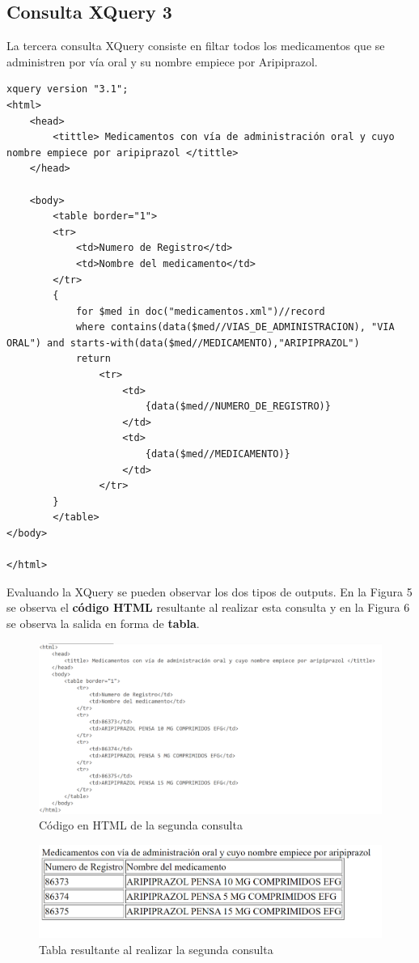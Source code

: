 \documentclass[../main.tex]{subfiles}
\begin{document}
\subsection{Consulta XQuery 3}
La tercera consulta XQuery consiste en filtar todos los medicamentos que se administren por vía oral y su nombre empiece por Aripiprazol.

\begin{lstlisting}
xquery version "3.1";
<html>
    <head>
        <tittle> Medicamentos con vía de administración oral y cuyo nombre empiece por aripiprazol </tittle>
    </head>
    
    <body>
        <table border="1">
        <tr>
            <td>Numero de Registro</td>
            <td>Nombre del medicamento</td>
        </tr>
        {
            for $med in doc("medicamentos.xml")//record
            where contains(data($med//VIAS_DE_ADMINISTRACION), "VIA ORAL") and starts-with(data($med//MEDICAMENTO),"ARIPIPRAZOL")
            return 
                <tr> 
                    <td> 
                        {data($med//NUMERO_DE_REGISTRO)}
                    </td>
                    <td>
                        {data($med//MEDICAMENTO)}
                    </td>
                </tr>
        }
        </table>
</body>

</html>

\end{lstlisting}

Evaluando la XQuery se pueden observar los dos tipos de outputs. En la Figura 5 se observa el \textbf{código HTML} resultante al realizar esta consulta y en la Figura 6 se observa la salida en forma de \textbf{tabla}.


\begin{figure}[h]
    \centering
    \includegraphics[scale=0.3]{images/xquery_3_html.png}
    \caption{Código en HTML de la segunda consulta}
    \label{fig:mesh1}
\end{figure}

\begin{figure}[h]
    \centering
    \includegraphics[scale=0.3]{images/xquery_3_output.png}
    \caption{Tabla resultante al realizar la segunda consulta}
    \label{fig:mesh1}
\end{figure}
\end{document}
